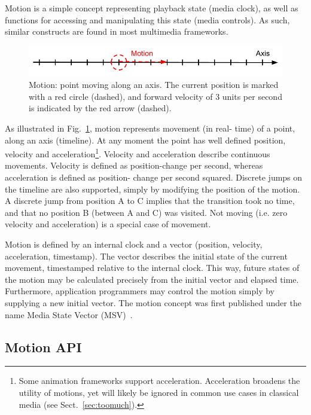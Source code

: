 Motion is a simple concept representing playback state (media clock), as well
as functions for accessing and manipulating this state (media controls). As
such, similar constructs are found in most multimedia frameworks.

\begin{figure}[h]
\centering
\includegraphics[scale=.4]{fig/motion-axis.png}
\caption{Motion: point moving along an axis. The current position
is marked with a red circle (dashed), and forward velocity of 3 units per second is
indicated by the red arrow (dashed).}
\label{fig:motion}
\end{figure}

As illustrated in Fig.~\ref{fig:motion}, motion represents movement (in real-
time) of a point, along an axis (timeline). At any moment the point has well
defined position, velocity and acceleration\footnote{Some animation frameworks
support acceleration. Acceleration broadens the utility of motions, yet will
likely be ignored in common use cases in classical media (see
Sect.~\ref{sec:toomuch}).}. Velocity and acceleration describe continuous
movements. Velocity is defined as position-change per second, whereas
acceleration is defined as position- change per second squared. Discrete jumps
on the timeline are also supported, simply by modifying the position of the
motion. A discrete jump from position A to C implies that the transition took
no time, and that no position B (between A and C) was visited. Not moving
(i.e. zero velocity and acceleration) is a special case of movement.

\label{sec:internalstate}
Motion is defined by an internal clock and a vector (position, velocity,
acceleration, timestamp). The vector describes the initial state of the
current movement, timestamped relative to the internal clock. This way, future
states of the motion may be calculated precisely from the initial vector and
elapsed time. Furthermore, application programmers may control the motion
simply by supplying a new initial vector. The motion concept was first
published under the name Media State Vector (MSV)~\cite{msv}.


\subsection{Motion API}
\label{sec:motionapi}


